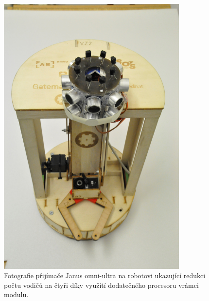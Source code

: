 \begin{figure}[htbp]
    \centering
    \includegraphics[width=0.85\textwidth]{img/prijimac-3.JPG}
    \caption{Fotografie přijímače Janus omni-ultra na robotovi ukazující redukci počtu vodičů na čtyři díky využití dodatečného procesoru vrámci modulu.}
    \label{fig:prijimac3}
\end{figure}